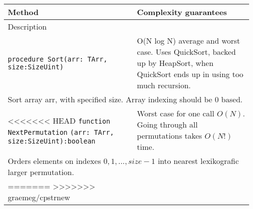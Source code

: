 \begin{longtable}{|m{10cm}|m{5cm}|}
\hline
Method & Complexity guarantees \\ \hline
\multicolumn{2}{|m{15cm}|}{Description} \\ \hline\hline

\verb!procedure Sort(arr: TArr, size:SizeUint)! &
O(N log N) average and worst case. Uses QuickSort, backed up by HeapSort, when QuickSort ends up in
using too much recursion.\\ \hline
\multicolumn{2}{|m{15cm}|}{Sort array arr, with specified size. Array indexing should be 0 based.} \\\hline\hline

<<<<<<< HEAD
\verb!function NextPermutation! \verb!(arr: TArr, size:SizeUint):boolean! &
Worst case for one call $O(N)$. Going through all permutations takes $O(N!)$ time.\\ \hline
\multicolumn{2}{|m{15cm}|}{Orders elements on indexes $0, 1, \dots, size-1$ into nearest
lexikografic larger permutation.} \\\hline


=======
>>>>>>> graemeg/cpstrnew
\end{longtable}
